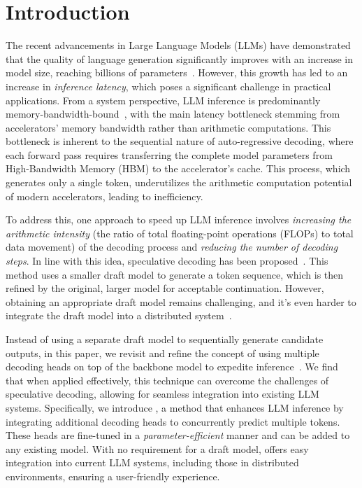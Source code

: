\section{Introduction}
The recent advancements in Large Language Models (LLMs) have demonstrated that the quality of language generation significantly improves with an increase in model size, reaching billions of parameters~\citep{brown2020language,chowdhery2022palm,zhang2022opt,hoffmann2022training,openai2023gpt4,google2023palm2,touvron2023llama}. However, this growth has led to an increase in \emph{inference latency}, which poses a significant challenge in practical applications. From a system perspective, LLM inference is predominantly memory-bandwidth-bound~\citep{shazeer2019fast,kim2023squeezellm}, with the main latency bottleneck stemming from accelerators' memory bandwidth rather than arithmetic computations. This bottleneck is inherent to the sequential nature of auto-regressive decoding, where each forward pass requires transferring the complete model parameters from High-Bandwidth Memory (HBM) to the accelerator's cache. This process, which generates only a single token, underutilizes the arithmetic computation potential of modern accelerators, leading to inefficiency.

To address this, one approach to speed up LLM inference involves \emph{increasing the arithmetic intensity} (the ratio of total floating-point operations (FLOPs) to total data movement) of the decoding process and \emph{reducing the number of decoding steps}. In line with this idea, speculative decoding has been proposed~\citep{leviathan2022fast,chen2023accelerating,xia2023speculative,miao2023specinfer}. This method uses a smaller draft model to generate a token sequence, which is then refined by the original, larger model for acceptable continuation. However, obtaining an appropriate draft model remains challenging, and it's even harder to integrate the draft model into a distributed system~\citep{chen2023accelerating}.

Instead of using a separate draft model to sequentially generate candidate outputs, in this paper, we revisit and refine the concept of using multiple decoding heads on top of the backbone model to expedite inference~\citep{stern2018blockwise}. We find that when applied effectively, this technique can overcome the challenges of speculative decoding, allowing for seamless integration into existing LLM systems. Specifically, we introduce \ours, a method that enhances LLM inference by integrating additional decoding heads to concurrently predict multiple tokens. These heads are fine-tuned in a \emph{parameter-efficient} manner and can be added to any existing model. With no requirement for a draft model, \ours offers easy integration into current LLM systems, including those in distributed environments, ensuring a user-friendly experience.

